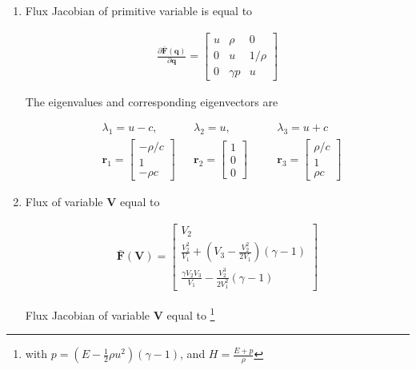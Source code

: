 \documentclass[11pt]{diazessay} %
\begin{document}
\begin{enumerate}
    \item Flux Jacobian of primitive variable is equal to 

    $$
    \begin{aligned}
        \frac{\partial \bar{\textbf{F}}(\textbf{q})}{\partial \textbf{q}}= \begin{bmatrix}
            u & \rho & 0\\
            0 & u & 1/\rho\\
            0 & \gamma p & u
        \end{bmatrix}
    \end{aligned}
    $$

    The eigenvalues and corresponding eigenvectors are

    $$
    \begin{aligned}
        & \lambda_1 = u -c, &&\lambda_2 = u,\quad && \lambda_3 = u+c\\
        &\textbf{r}_1 =\begin{bmatrix} -\rho /c\\1\\-\rho c\end{bmatrix}
        &&\textbf{r}_2 =\begin{bmatrix} 1 \\ 0 \\ 0 \end{bmatrix}\quad
        &&\textbf{r}_3 =\begin{bmatrix} \rho /c\\1\\\rho c\end{bmatrix}
    \end{aligned}
    $$

    \item Flux of variable $\textbf{V}$ equal to
    
    $$
    \begin{aligned}
        \bar{\textbf{F}}(\textbf{V})= \begin{bmatrix}
            V_2\\ 
            \frac{V_2^2}{V_1} + \left(V_3 - \frac{V_2^2}{2V_1}\right) (\gamma -1)\\
            \frac{\gamma V_2V_3}{V_1} - \frac{V_2^3}{2V_1^2}(\gamma -1)
        \end{bmatrix}
    \end{aligned}
    $$


    Flux Jacobian of variable $\textbf{V}$ equal to \footnote{with $p = (E - \frac{1}{2}\rho u^2)(\gamma -1)$, and $H=\frac{E+p}{\rho}$}


\end{enumerate}
\end{document}
